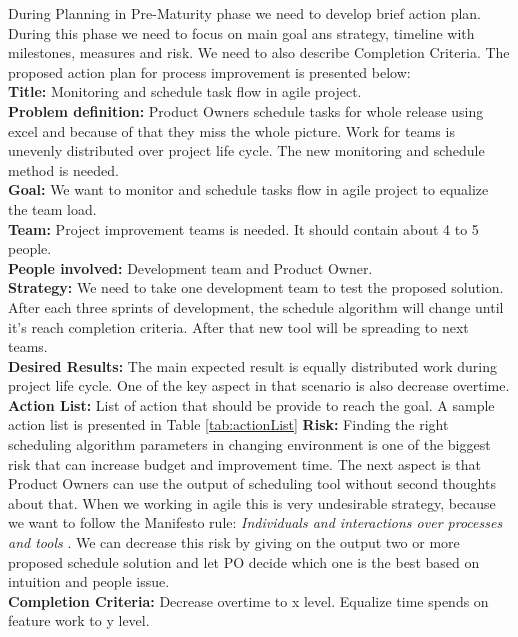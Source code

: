During Planning in Pre-Maturity phase we need to develop brief action plan. During this phase we need to focus on main goal ans strategy, timeline with milestones, measures and risk. We need to also describe Completion Criteria. The proposed action plan for process improvement is presented below: \\
\textbf{Title:}  Monitoring and schedule task flow in agile project.\\
\textbf{Problem definition:} Product Owners schedule tasks for whole release using excel and because of that they miss the whole picture. Work for teams is unevenly distributed over project life cycle. The new monitoring and schedule method is needed.\\
\textbf{Goal:}  We want to monitor and schedule tasks flow in agile project to equalize the team load.\\
\textbf{Team:} Project improvement teams is needed. It should contain about 4 to 5 people.\\
\textbf{People involved:} Development team and Product Owner.\\
\textbf{Strategy:} We need to take one development team to test the proposed solution. After each three sprints of development, the schedule algorithm will change until it's reach completion criteria. After that new tool will be spreading to next teams.\\
\textbf{Desired Results:} The main expected result is equally distributed work during project life cycle. One of the key aspect in that scenario is also decrease overtime.\\
\textbf{Action List:} List of action that should be provide to reach the goal. A sample action list is presented in Table \ref{tab:actionList}
\textbf{Risk:} Finding the right scheduling algorithm parameters in changing environment is one of the biggest risk that can increase budget and improvement time. The next aspect is that Product Owners can use the output of scheduling tool without second thoughts about that. When we working in agile this is very undesirable strategy, because we want to follow the Manifesto rule: \textit{Individuals and interactions over processes and tools} \cite{manifesto}. We can decrease this risk by giving on the output two or more proposed schedule solution and let PO decide which one is the best based on intuition and people issue. \\
\textbf{Completion Criteria:} Decrease overtime to x level. Equalize  time spends on feature work to y level.

